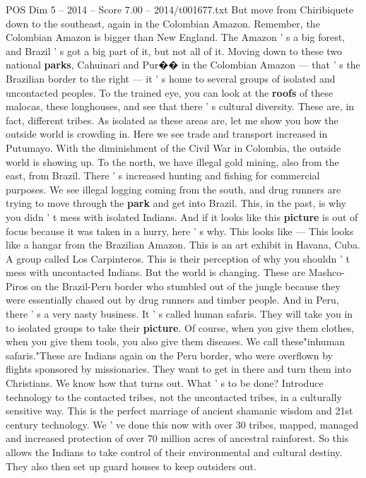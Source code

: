 \begin{textsample}{POS Dim 5 – 2014 – Score 7.00 – 2014/t001677.txt}
But move from Chiribiquete down to the southeast, again in the Colombian Amazon.
Remember, the Colombian Amazon is bigger than New England.
The Amazon ' s a big forest, and Brazil ' s got a big part of it, but not all of it.
Moving down to these two national \textbf{parks}, Cahuinari and Pur{\EmojiFont �}{\EmojiFont �} in the Colombian Amazon — that ' s the Brazilian border to the right — it ' s home to several groups of isolated and uncontacted peoples.
To the trained eye, you can look at the \textbf{roofs} of these malocas, these longhouses, and see that there ' s cultural diversity.
These are, in fact, different tribes.
As isolated as these areas are, let me show you how the outside world is crowding in.
Here we see trade and transport increased in Putumayo.
With the diminishment of the Civil War in Colombia, the outside world is showing up.
To the north, we have illegal gold mining, also from the east, from Brazil.
There ' s increased hunting and fishing for commercial purposes.
We see illegal logging coming from the south, and drug runners are trying to move through the \textbf{park} and get into Brazil.
This, in the past, is why you didn ' t mess with isolated Indians.
And if it looks like this \textbf{picture} is out of focus because it was taken in a hurry, here ' s why.
This looks like — This looks like a hangar from the Brazilian Amazon.
This is an art exhibit in Havana, Cuba.
A group called Los Carpinteros.
This is their perception of why you shouldn ' t mess with uncontacted Indians.
But the world is changing.
These are Mashco-Piros on the Brazil-Peru border who stumbled out of the jungle because they were essentially chased out by drug runners and timber people.
And in Peru, there ' s a very nasty business.
It ' s called human safaris.
They will take you in to isolated groups to take their \textbf{picture}.
Of course, when you give them clothes, when you give them tools, you also give them diseases.
We call these"inhuman safaris."These are Indians again on the Peru border, who were overflown by flights sponsored by missionaries.
They want to get in there and turn them into Christians.
We know how that turns out.
What ' s to be done?
Introduce technology to the contacted tribes, not the uncontacted tribes, in a culturally sensitive way.
This is the perfect marriage of ancient shamanic wisdom and 21st century technology.
We ' ve done this now with over 30 tribes, mapped, managed and increased protection of over 70 million acres of ancestral rainforest.
So this allows the Indians to take control of their environmental and cultural destiny.
They also then set up guard houses to keep outsiders out.

\end{textsample}
